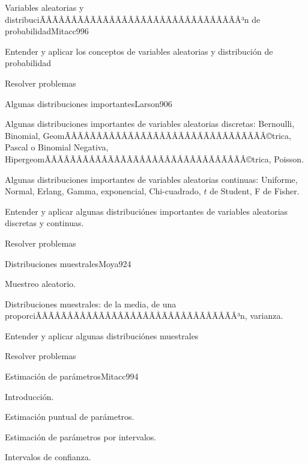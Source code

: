 \begin{sumilla}
\begin{unit}{Variables aleatorias y distribuciÃÂÃÂÃÂÃÂÃÂÃÂÃÂÃÂÃÂÃÂÃÂÃÂÃÂÃÂÃÂÃÂ³n de probabilidad}{Mitacc99}{6}
   \begin{objetivos}
         \item  Entender y aplicar los conceptos de variables aleatorias y  distribuci\'on de probabilidad
         \item  Resolver problemas
   \end{objetivos}
\end{unit}

\begin{unit}{Algunas distribuciones importantes}{Larson90}{6}
   \begin{topicos}
         \item  Algunas distribuciones importantes de variables aleatorias discretas: Bernoulli, Binomial,  GeomÃÂÃÂÃÂÃÂÃÂÃÂÃÂÃÂÃÂÃÂÃÂÃÂÃÂÃÂÃÂÃÂ©trica, Pascal o Binomial Negativa, HipergeomÃÂÃÂÃÂÃÂÃÂÃÂÃÂÃÂÃÂÃÂÃÂÃÂÃÂÃÂÃÂÃÂ©trica, Poisson.
	 \item  Algunas distribuciones importantes de variables aleatorias continuas: Uniforme, Normal, Erlang, Gamma, exponencial, Chi-cuadrado, $t$ de Student, F de Fisher.
   \end{topicos}

   \begin{objetivos}
         \item  Entender y aplicar algunas distribuci\'ones importantes de variables aleatorias discretas y continuas.
         \item  Resolver problemas
   \end{objetivos}
\end{unit}

\begin{unit}{Distribuciones muestrales}{Moya92}{4}
   \begin{topicos}
         \item  Muestreo aleatorio.
	 \item  Distribuciones muestrales: de la media, de una proporciÃÂÃÂÃÂÃÂÃÂÃÂÃÂÃÂÃÂÃÂÃÂÃÂÃÂÃÂÃÂÃÂ³n, varianza.
   \end{topicos}

   \begin{objetivos}
         \item  Entender y aplicar algunas distribuci\'ones muestrales
         \item  Resolver problemas
   \end{objetivos}
\end{unit}

\begin{unit}{Estimaci\'on de par\'ametros}{Mitacc99}{4}
   \begin{topicos}
         \item  Introducci\'on.
	 \item  Estimaci\'on puntual de par\'ametros.
	\item Estimaci\'on de par\'ametros por intervalos.
	\item Intervalos de confianza.
   \end{topicos}


\end{unit}
\end{sumilla}

